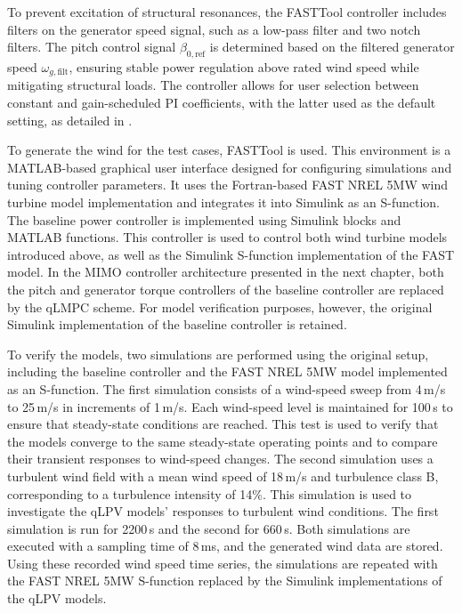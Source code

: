     To prevent excitation of structural resonances, the FASTTool controller includes filters on the generator speed signal, such as a low-pass filter and two notch filters. The pitch control signal \(\beta_{0,\text{ref}}\) is determined based on the filtered generator speed \(\omega_{g,\text{filt}}\), ensuring stable power regulation above rated wind speed while mitigating structural loads. The controller allows for user selection between constant and gain-scheduled PI coefficients, with the latter used as the default setting, as detailed in \cite{mulders2020wind}.
    
    To generate the wind for the test cases, FASTTool is used. This environment is a MATLAB-based graphical user interface designed for configuring simulations and tuning controller parameters. It uses the Fortran-based FAST NREL 5MW wind turbine model implementation and integrates it into Simulink as an S-function. The baseline power controller is implemented using Simulink blocks and MATLAB functions. This controller is used to control both wind turbine models introduced above, as well as the Simulink S-function implementation of the FAST model. In the MIMO controller architecture presented in the next chapter, both the pitch and generator torque controllers of the baseline controller are replaced by the qLMPC scheme. For model verification purposes, however, the original Simulink implementation of the baseline controller is retained. 
    
    To verify the models, two simulations are performed using the original setup, including the baseline controller and the FAST NREL 5MW model implemented as an S-function. The first simulation consists of a wind-speed sweep from 4\,m/s to 25\,m/s in increments of 1\,m/s. Each wind-speed level is maintained for 100\,s to ensure that steady-state conditions are reached. This test is used to verify that the models converge to the same steady-state operating points and to compare their transient responses to wind-speed changes. The second simulation uses a turbulent wind field with a mean wind speed of 18\,m/s and turbulence class B, corresponding to a turbulence intensity of 14\%. This simulation is used to investigate the qLPV models' responses to turbulent wind conditions. The first simulation is run for 2200\,s and the second for 660\,s. Both simulations are executed with a sampling time of 8\,ms, and the generated wind data are stored. Using these recorded wind speed time series, the simulations are repeated with the FAST NREL 5MW S-function replaced by the Simulink implementations of the qLPV models.
    
